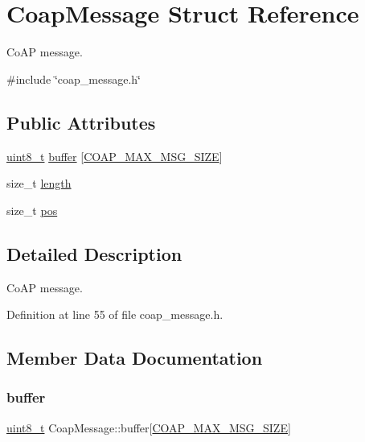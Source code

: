 \hypertarget{structCoapMessage}{}\section{Coap\+Message Struct Reference}
\label{structCoapMessage}


Co\+AP message.  




{\ttfamily \#include \char`\"{}coap\+\_\+message.\+h\char`\"{}}

\subsection*{Public Attributes}
\begin{DoxyCompactItemize}
\item 
\hyperlink{stdint_8h_aba7bc1797add20fe3efdf37ced1182c5}{uint8\+\_\+t} \hyperlink{structCoapMessage_ab8ec8f8181bf0b24d5d63f6701df0ecf}{buffer} \mbox{[}\hyperlink{coap__message_8h_a335f86dbb26e7c7c80679116ec6bb120}{C\+O\+A\+P\+\_\+\+M\+A\+X\+\_\+\+M\+S\+G\+\_\+\+S\+I\+ZE}\mbox{]}
\item 
size\+\_\+t \hyperlink{structCoapMessage_a0b85357992e3b1941c8621058369b842}{length}
\item 
size\+\_\+t \hyperlink{structCoapMessage_a8b472e6e9abab26da8f884f0eb3ce015}{pos}
\end{DoxyCompactItemize}


\subsection{Detailed Description}
Co\+AP message. 

Definition at line 55 of file coap\+\_\+message.\+h.



\subsection{Member Data Documentation}
\mbox{\label{structCoapMessage_ab8ec8f8181bf0b24d5d63f6701df0ecf}} 
\subsubsection{\texorpdfstring{buffer}{buffer}}
{\footnotesize\ttfamily \hyperlink{stdint_8h_aba7bc1797add20fe3efdf37ced1182c5}{uint8\+\_\+t} Coap\+Message\+::buffer\mbox{[}\hyperlink{coap__message_8h_a335f86dbb26e7c7c80679116ec6bb120}{C\+O\+A\+P\+\_\+\+M\+A\+X\+\_\+\+M\+S\+G\+\_\+\+S\+I\+ZE}\mbox{]}}



